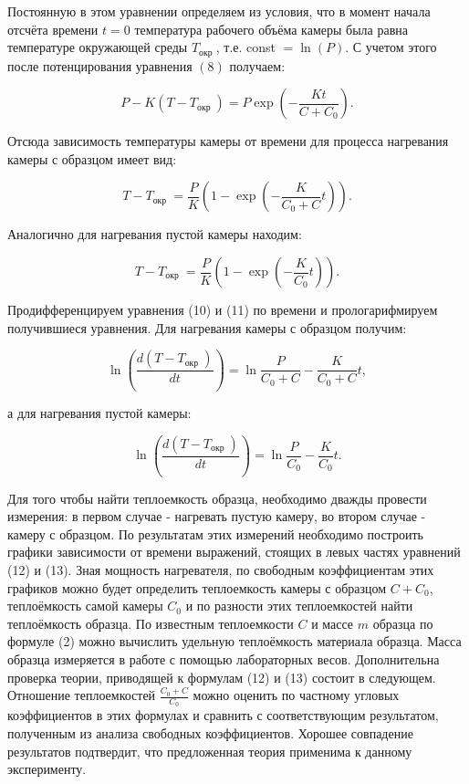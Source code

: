\documentclass[a4paper]{article}
\begin{document}
Постоянную в этом уравнении определяем из условия, что в момент начала отсчёта времени $t=0$ температура рабочего объёма камеры была равна температуре окружающей среды $T_{\text {окр }}$, т.е. const $=\ln (P)$. С учетом этого после потенцирования уравнения $(8)$ получаем:


\begin{equation*}
P-K\left(T-T_{\text {окр }}\right)=P \exp \left(-\frac{K t}{C+C_{0}}\right) . \tag{9}
\end{equation*}


Отсюда зависимость температуры камеры от времени для процесса нагревания камеры с образцом имеет вид:


\begin{equation*}
T-T_{\text {окр }}=\frac{P}{K}\left(1-\exp \left(-\frac{K}{C_{0}+C} t\right)\right) . \tag{10}
\end{equation*}


Аналогично для нагревания пустой камеры находим:


\begin{equation*}
T-T_{\text {окр }}=\frac{P}{K}\left(1-\exp \left(-\frac{K}{C_{0}} t\right)\right) . \tag{11}
\end{equation*}


Продифференцируем уравнения (10) и (11) по времени и прологарифмируем получившиеся уравнения. Для нагревания камеры с образцом получим:


\begin{equation*}
\ln \left(\frac{d\left(T-T_{\text {окр }}\right)}{d t}\right)=\ln \frac{P}{C_{0}+C}-\frac{K}{C_{0}+C} t, \tag{12}
\end{equation*}


а для нагревания пустой камеры:


\begin{equation*}
\ln \left(\frac{d\left(T-T_{\text {окр }}\right)}{d t}\right)=\ln \frac{P}{C_{0}}-\frac{K}{C_{0}} t . \tag{13}
\end{equation*}


Для того чтобы найти теплоемкость образца, необходимо дважды провести измерения: в первом случае - нагревать пустую камеру, во втором случае - камеру с образцом. По результатам этих измерений необходимо построить графики зависимости от времени выражений, стоящих в левых частях уравнений (12) и (13). Зная мощность нагревателя, по свободным коэффициентам этих графиков можно будет определить теплоемкость камеры с образцом $C+C_{0}$, теплоёмкость самой камеры $C_{0}$ и по разности этих теплоемкостей найти теплоёмкость образца. По известным теплоемкости $C$ и массе $m$ образца по формуле (2) можно вычислить удельную теплоёмкость материала образца. Масса образца измеряется в работе с помощью лабораторных весов. Дополнительна проверка теории, приводящей к формулам (12) и (13) состоит в следующем. Отношение теплоемкостей $\frac{C_{0}+C}{C_{0}}$ можно оценить по частному угловых коэффициентов в этих формулах и сравнить с соответствующим результатом, полученным из анализа свободных коэффициентов. Хорошее совпадение результатов подтвердит, что предложенная теория применима к данному эксперименту.
\end{document}
